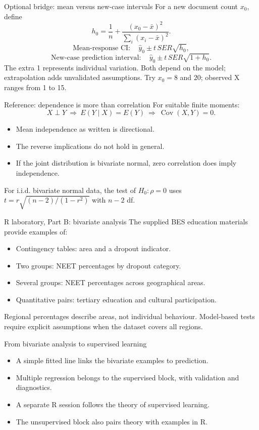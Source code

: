 \begin{frame}{Optional bridge: mean versus new-case intervals}
For a new document count $x_0$, define
\[
h_0=\frac1n+\frac{(x_0-\bar x)^2}{\sum_i(x_i-\bar x)^2}.
\]
\[
\text{Mean-response CI}:\quad \widehat y_0\pm t\,SER\sqrt{h_0},
\]
\[
\text{New-case prediction interval}:\quad \widehat y_0\pm t\,SER\sqrt{1+h_0}.
\]
The extra 1 represents individual variation. Both depend on the model; extrapolation adds unvalidated assumptions. Try $x_0=8$ and $20$; observed X ranges from 1 to 15.
\end{frame}
\begin{frame}{Reference: dependence is more than correlation}
For suitable finite moments:
\[
X\perp Y\ \Rightarrow\ E(Y\mid X)=E(Y)\ \Rightarrow\ \operatorname{Cov}(X,Y)=0.
\]
\begin{itemize}\item Mean independence as written is directional.\item The reverse implications do not hold in general.\item If the joint distribution is bivariate normal, zero correlation does imply independence.\end{itemize}
For i.i.d. bivariate normal data, the test of $H_0:\rho=0$ uses $t=r\sqrt{(n-2)/(1-r^2)}$ with $n-2$ df.
\end{frame}
\begin{frame}{R laboratory, Part B: bivariate analysis}
The supplied BES education materials provide examples of:
\begin{itemize}
\item Contingency tables: area and a dropout indicator.
\item Two groups: NEET percentages by dropout category.
\item Several groups: NEET percentages across geographical areas.
\item Quantitative pairs: tertiary education and cultural participation.
\end{itemize}
Regional percentages describe areas, not individual behaviour. Model-based tests require explicit assumptions when the dataset covers all regions.
\end{frame}
\begin{frame}{From bivariate analysis to supervised learning}
\begin{itemize}
\item A simple fitted line links the bivariate examples to prediction.
\item Multiple regression belongs to the supervised block, with validation and diagnostics.
\item A separate R session follows the theory of supervised learning.
\item The unsupervised block also pairs theory with examples in R.
\end{itemize}
\end{frame}

